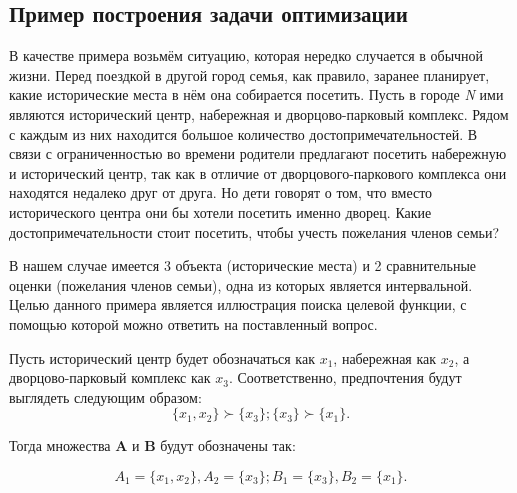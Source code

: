 \documentclass[12pt,a4paper,oneside]{article}
\begin{document}

\subsection{Пример построения задачи оптимизации}

\par
В качестве примера возьмём ситуацию, которая нередко случается в обычной жизни.
Перед поездкой в другой город семья, как правило, заранее планирует, какие исторические места в нём она собирается посетить. 
Пусть в городе \textit{N} ими являются исторический центр, набережная и дворцово-парковый комплекс. 
Рядом с каждым из них находится большое количество достопримечательностей. 
В связи с ограниченностью во времени родители предлагают посетить набережную и исторический центр, так как в отличие от дворцового-паркового комплекса они находятся недалеко друг от друга. 
Но дети говорят о том, что вместо исторического центра они бы хотели посетить именно дворец. 
Какие достопримечательности стоит посетить, чтобы учесть пожелания членов семьи?

\par
В нашем случае имеется 3 объекта (исторические места) и 2 сравнительные оценки (пожелания членов семьи), одна из которых является интервальной. 
Целью данного примера является иллюстрация поиска целевой функции, с помощью которой можно ответить на поставленный вопрос. 

\par
Пусть исторический центр будет обозначаться как \(x_1\), набережная как \(x_2\), а дворцово-парковый комплекс как \(x_3\). 
Соответственно, предпочтения будут выглядеть следующим образом: 
\[
\{x_1, x_2\} \succ \{x_3\}; \{x_3\} \succ \{x_1\}.
\]

\par
Тогда множества \(\mathbf{A}\) и \(\mathbf{B}\) будут обозначены так:

\[
A_1 = \{x_1, x_2\}, A_2 = \{x_3\}; B_1 = \{x_3\}, B_2 = \{x_1\}.
\]
\end{document}

